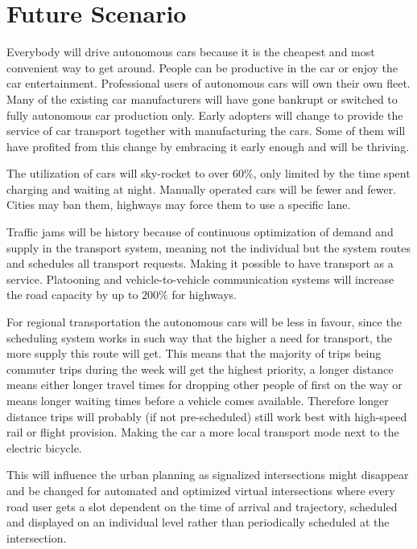\documentclass[a4paper]{article}
\begin{document}
\section{Future Scenario}
\label{sec:future-scenario}

Everybody will drive autonomous cars because it is the cheapest and most convenient way to get around. People can be productive in the car or enjoy the car entertainment.
Professional users of autonomous cars will own their own fleet. Many of the existing car manufacturers will have gone bankrupt or switched to fully autonomous car production only. Early adopters will change to provide the service of car transport together with manufacturing the cars. Some of them will have profited from this change by embracing it early enough and will be thriving.

The utilization of cars will sky-rocket to over $60\%$, only limited by the time spent charging and waiting at night. Manually operated cars will be fewer and fewer. Cities may ban them, highways may force them to use a specific lane.

Traffic jams will be history because of continuous optimization of demand and supply in the transport system, meaning not the individual but the system routes and schedules all transport requests. Making it possible to have transport as a service. Platooning and vehicle-to-vehicle communication systems will increase the road capacity by up to $200\%$ for highways.

For regional transportation the autonomous cars will be less in favour, since the scheduling system works in such way that the higher a need for transport, the more supply this route will get. This means that the majority of trips being commuter trips during the week will get the highest priority, a longer distance means either longer travel times for dropping other people of first on the way or means longer waiting times before a vehicle comes available. Therefore longer distance trips will probably (if not pre-scheduled) still work best with high-speed rail or flight provision. Making the car a more local transport mode next to the electric bicycle. 

This will influence the urban planning as signalized intersections might disappear and be changed for automated and optimized virtual intersections where every road user gets a slot dependent on the time of arrival and trajectory, scheduled and displayed on an individual level rather than periodically scheduled at the intersection.
\end{document}
